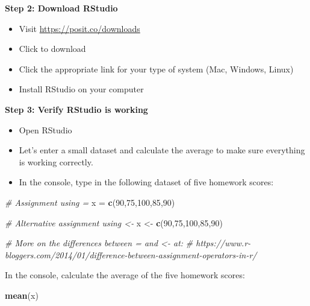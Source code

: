 \documentclass[
  11pt,
  oneside]{book}
\newenvironment{Shaded}{\begin{snugshade}}{\end{snugshade}}
\newcommand{\CommentTok}[1]{\textcolor[rgb]{0.56,0.35,0.01}{\textit{#1}}}
\newcommand{\DecValTok}[1]{\textcolor[rgb]{0.00,0.00,0.81}{#1}}
\newcommand{\FunctionTok}[1]{\textcolor[rgb]{0.13,0.29,0.53}{\textbf{#1}}}
\newcommand{\NormalTok}[1]{#1}
\newcommand{\OtherTok}[1]{\textcolor[rgb]{0.56,0.35,0.01}{#1}}
\providecommand{\tightlist}{%
  \setlength{\itemsep}{0pt}\setlength{\parskip}{0pt}}
\theoremstyle{definition}
\theoremstyle{definition}
\theoremstyle{definition}
\theoremstyle{definition}
\theoremstyle{remark}
\begin{document}
\textbf{Step 2: Download RStudio}

\begin{itemize}
\tightlist
\item
  Visit \url{https://posit.co/downloads}
\item
  Click to download
\item
  Click the appropriate link for your type of system (Mac, Windows, Linux)
\item
  Install RStudio on your computer
\end{itemize}

\newpage

\textbf{Step 3: Verify RStudio is working}

\begin{itemize}
\tightlist
\item
  Open RStudio
\item
  Let's enter a small dataset and calculate the average to make sure everything is working correctly.
\item
  In the console, type in the following dataset of five homework scores:
\end{itemize}

\begin{Shaded}
\begin{Highlighting}[]
\CommentTok{\# Assignment using = }
\NormalTok{x }\OtherTok{=} \FunctionTok{c}\NormalTok{(}\DecValTok{90}\NormalTok{,}\DecValTok{75}\NormalTok{,}\DecValTok{100}\NormalTok{,}\DecValTok{85}\NormalTok{,}\DecValTok{90}\NormalTok{)}

\CommentTok{\# Alternative assignment using \textless{}{-}}
\NormalTok{x }\OtherTok{\textless{}{-}} \FunctionTok{c}\NormalTok{(}\DecValTok{90}\NormalTok{,}\DecValTok{75}\NormalTok{,}\DecValTok{100}\NormalTok{,}\DecValTok{85}\NormalTok{,}\DecValTok{90}\NormalTok{)}

\CommentTok{\# More on the differences between = and \textless{}{-} at:}
\CommentTok{\# https://www.r{-}bloggers.com/2014/01/difference{-}between{-}assignment{-}operators{-}in{-}r/}
\end{Highlighting}
\end{Shaded}

In the console, calculate the average of the five homework scores:\\

\begin{Shaded}
\begin{Highlighting}[]
\FunctionTok{mean}\NormalTok{(x)}
\end{Highlighting}
\end{Shaded}
\end{document}
